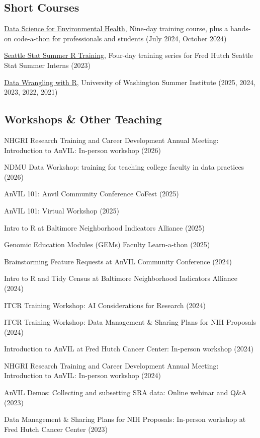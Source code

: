 \documentclass{cv}
\begin{document}
\subsection*{Short Courses}

\href{https://daseh.org/}{Data Science for Environmental Health}, Nine-day training course, plus a hands-on code-a-thon for professionals and students (July 2024, October 2024)

\href{https://hutchdatascience.org/SeattleStatSummer_R}{Seattle Stat Summer R Training}, Four-day training series for Fred Hutch Seattle Stat Summer Interns (2023)

\href{http://sisbid.github.io/Data-Wrangling/}{Data Wrangling with R}, University of Washington Summer Institute (2025, 2024, 2023, 2022, 2021)

\subsection*{Workshops \& Other Teaching}

NHGRI Research Training and Career Development Annual Meeting: Introduction to AnVIL: In-person workshop (2026)

NDMU Data Workshop: training for teaching college faculty in data practices (2026)

AnVIL 101: Anvil Community Conference CoFest (2025)

AnVIL 101: Virtual Workshop (2025)

Intro to R at Baltimore Neighborhood Indicators Alliance (2025)

Genomic Education Modules (GEMs) Faculty Learn-a-thon (2025)

Brainstorming Feature Requests at AnVIL Community Conference (2024)

Intro to R and Tidy Census at Baltimore Neighborhood Indicators Alliance (2024)

ITCR Training Workshop: AI Considerations for Research (2024)

ITCR Training Workshop: Data Management \& Sharing Plans for NIH Proposals (2024)

Introduction to AnVIL at Fred Hutch Cancer Center: In-person workshop (2024)

NHGRI Research Training and Career Development Annual Meeting: Introduction to AnVIL: In-person workshop (2024)

AnVIL Demos: Collecting and subsetting SRA data: Online webinar and Q\&A (2023)

Data Management \& Sharing Plans for NIH Proposals: In-person workshop at Fred Hutch Cancer Center (2023)
\end{document}
